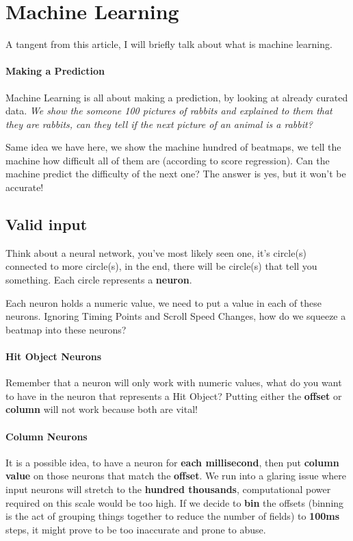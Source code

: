 \documentclass{article}
\begin{document}
\section{Machine Learning}

A tangent from this article, I will briefly talk about what is machine learning.

\paragraph{Making a Prediction} Machine Learning is all about making a prediction, by looking at already curated data. \textit{We show the someone 100 pictures of rabbits and explained to them that they are rabbits, can they tell if the next picture of an animal is a rabbit?}

Same idea we have here, we show the machine hundred of beatmaps, we tell the machine how difficult all of them are (according to score regression). Can the machine predict the difficulty of the next one? The answer is yes, but it won't be accurate!

\subsection{Valid input}

Think about a neural network, you've most likely seen one, it's circle(s) connected to more circle(s), in the end, there will be circle(s) that tell you something. Each circle represents a \textbf{neuron}.

Each neuron holds a numeric value, we need to put a value in each of these neurons. Ignoring Timing Points and Scroll Speed Changes, how do we squeeze a beatmap into these neurons?

\paragraph{Hit Object Neurons} Remember that a neuron will only work with numeric values, what do you want to have in the neuron that represents a Hit Object? Putting either the \textbf{offset} or \textbf{column} will not work because both are vital!

\paragraph{Column Neurons} It is a possible idea, to have a neuron for \textbf{each millisecond}, then put \textbf{column value} on those neurons that match the \textbf{offset}. We run into a glaring issue where input neurons will stretch to the \textbf{hundred thousands}, computational power required on this scale would be too high. If we decide to \textbf{bin} the offsets (binning is the act of grouping things together to reduce the number of fields) to \textbf{100ms} steps, it might prove to be too inaccurate and prone to abuse.
\end{document}
